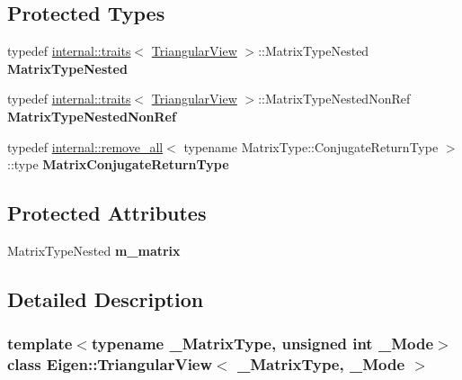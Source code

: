 \subsection*{Protected Types}
\begin{DoxyCompactItemize}
\item 
\mbox{\label{class_eigen_1_1_triangular_view_aa2dd47b3adef6eb1ced6e04035cc24ad}} 
typedef \mbox{\hyperlink{struct_eigen_1_1internal_1_1traits}{internal\+::traits}}$<$ \mbox{\hyperlink{class_eigen_1_1_triangular_view}{Triangular\+View}} $>$\+::Matrix\+Type\+Nested {\bfseries Matrix\+Type\+Nested}
\item 
\mbox{\label{class_eigen_1_1_triangular_view_a0b883860804b932adf27655ff77d94a1}} 
typedef \mbox{\hyperlink{struct_eigen_1_1internal_1_1traits}{internal\+::traits}}$<$ \mbox{\hyperlink{class_eigen_1_1_triangular_view}{Triangular\+View}} $>$\+::Matrix\+Type\+Nested\+Non\+Ref {\bfseries Matrix\+Type\+Nested\+Non\+Ref}
\item 
\mbox{\label{class_eigen_1_1_triangular_view_a2379f08549a98f299fcd21b7cb855256}} 
typedef \mbox{\hyperlink{struct_eigen_1_1internal_1_1remove__all}{internal\+::remove\+\_\+all}}$<$ typename Matrix\+Type\+::\+Conjugate\+Return\+Type $>$\+::type {\bfseries Matrix\+Conjugate\+Return\+Type}
\end{DoxyCompactItemize}
\subsection*{Protected Attributes}
\begin{DoxyCompactItemize}
\item 
\mbox{\label{class_eigen_1_1_triangular_view_a21a4d49656a57ff5b7bfee2efb02948b}} 
Matrix\+Type\+Nested {\bfseries m\+\_\+matrix}
\end{DoxyCompactItemize}


\subsection{Detailed Description}
\subsubsection*{template$<$typename \+\_\+\+Matrix\+Type, unsigned int \+\_\+\+Mode$>$\newline
class Eigen\+::\+Triangular\+View$<$ \+\_\+\+Matrix\+Type, \+\_\+\+Mode $>$}

